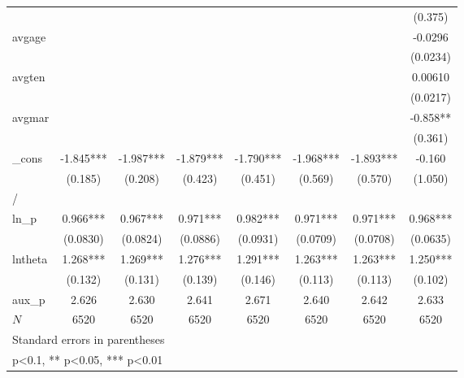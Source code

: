 \begin{table}[htbp]
\begin{tabular}{l*{7}{c}}
            &               &               &               &               &               &               &     (0.375)   \\
[1em]
avgage      &               &               &               &               &               &               &     -0.0296   \\
            &               &               &               &               &               &               &    (0.0234)   \\
[1em]
avgten      &               &               &               &               &               &               &     0.00610   \\
            &               &               &               &               &               &               &    (0.0217)   \\
[1em]
avgmar      &               &               &               &               &               &               &      -0.858** \\
            &               &               &               &               &               &               &     (0.361)   \\
[1em]
\_cons      &      -1.845***&      -1.987***&      -1.879***&      -1.790***&      -1.968***&      -1.893***&      -0.160   \\
            &     (0.185)   &     (0.208)   &     (0.423)   &     (0.451)   &     (0.569)   &     (0.570)   &     (1.050)   \\
\hline
/           &               &               &               &               &               &               &               \\
ln\_p        &       0.966***&       0.967***&       0.971***&       0.982***&       0.971***&       0.971***&       0.968***\\
            &    (0.0830)   &    (0.0824)   &    (0.0886)   &    (0.0931)   &    (0.0709)   &    (0.0708)   &    (0.0635)   \\
[1em]
lntheta     &       1.268***&       1.269***&       1.276***&       1.291***&       1.263***&       1.263***&       1.250***\\
            &     (0.132)   &     (0.131)   &     (0.139)   &     (0.146)   &     (0.113)   &     (0.113)   &     (0.102)   \\
\hline
aux\_p       &       2.626   &       2.630   &       2.641   &       2.671   &       2.640   &       2.642   &       2.633   \\
\(N\)       &        6520   &        6520   &        6520   &        6520   &        6520   &        6520   &        6520   \\
\hline\hline
\multicolumn{8}{l}{\footnotesize Standard errors in parentheses}\\
\multicolumn{8}{l}{\footnotesize * p<0.1, ** p<0.05, *** p<0.01}\\
\end{tabular}
\end{table}
